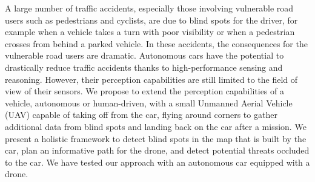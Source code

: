 
A large number of traffic accidents, especially those involving vulnerable road users such as pedestrians and cyclists, are due to blind spots for the driver, for example when a vehicle takes a turn with poor visibility or when a pedestrian crosses from behind a parked vehicle. In these accidents, the consequences for the vulnerable road users are dramatic. Autonomous cars have the potential to drastically reduce traffic accidents thanks to high-performance sensing and reasoning. However, their perception capabilities are still limited to the field of view of their sensors.
We propose to extend the perception capabilities of a vehicle, autonomous or human-driven, with a small Unmanned Aerial Vehicle (UAV) capable of taking off from the car, flying around corners to gather additional data from blind spots and landing back on the car after a mission. We present a holistic framework to detect blind spots in the map that is built by the car, plan an informative path for the drone, and detect potential threats occluded to the car. We have tested our approach with an autonomous car equipped with a drone.